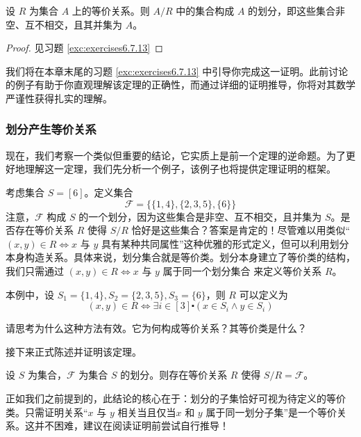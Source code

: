 \begin{theorem}\label{theorem6.4.10}
    设 $R$ 为集合 $A$ 上的等价关系。则 $A/R$ 中的集合构成 $A$ 的划分，即这些集合非空、互不相交，且其并集为 $A$。
\end{theorem}

\begin{proof}
    见习题 \ref{exc:exercises6.7.13}
\end{proof}

我们将在本章末尾的习题 \ref{exc:exercises6.7.13} 中引导你完成这一证明。此前讨论的例子有助于你直观理解该定理的正确性，而通过详细的证明推导，你将对其数学严谨性获得扎实的理解。

\subsubsection*{划分产生等价关系}

现在，我们考察一个类似但重要的结论，它实质上是前一个定理的逆命题。为了更好地理解这一定理，我们先分析一个例子，该例子也将提供定理证明的框架。

\begin{example}
    考虑集合 $S=[6]$。定义集合
    \[\mathcal{F} = \big\{ \{1, 4\}, \{2, 3, 5\} , \{6\} \big\}\]
    注意，$\mathcal{F}$ 构成 $S$ 的一个划分，因为这些集合是非空、互不相交，且并集为 $S$。是否存在等价关系 $R$ 使得 $S/R$ 恰好是这些集合？答案是肯定的！尽管难以用类似``$(x, y) \in R \iff x$ 与 $y$ 具有某种共同属性''这种优雅的形式定义，但可以利用划分本身构造关系。具体来说，划分集合就是等价类。划分本身建立了等价类的结构，我们只需通过 $(x, y) \in R \iff x \text{\ 与\ } y \text{\ 属于同一个划分集合}$ 来定义等价关系 $R$。

    本例中，设 $S_1 = \{1, 4\}, S_2 = \{2, 3, 5\}, S_3 = \{6\}$，则 $R$ 可以定义为
    \[(x, y) \in R \iff \exists i \in [3] \centerdot (x \in S_i \land y \in S_i)\]

    请思考为什么这种方法有效。它为何构成等价关系？其等价类是什么？
\end{example}

接下来正式陈述并证明该定理。

\begin{theorem}\label{theorem6.4.12}
    设 $S$ 为集合，$\mathcal{F}$ 为集合 $S$ 的划分。则存在等价关系 $R$ 使得 $S/R=\mathcal{F}$。
\end{theorem}

正如我们之前提到的，此结论的核心在于：划分的子集恰好可视为待定义的等价类。只需证明关系``$x$ 与 $y$ 相关当且仅当$x$ 和 $y$ 属于同一划分子集''是一个等价关系。这并不困难，建议在阅读证明前尝试自行推导！

